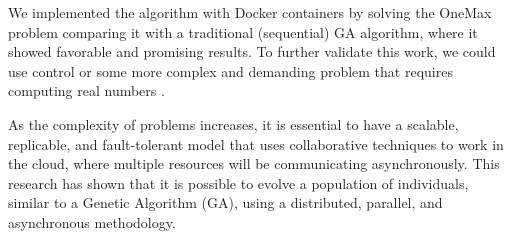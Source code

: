 \documentclass[graybox]{svmult}
\begin{document}
We implemented the algorithm with Docker containers by solving the OneMax
problem comparing it with a traditional (sequential) GA algorithm, where it
showed favorable and promising results. To further validate this work, we could
use control or some more complex and demanding problem that requires computing
real numbers \cite{stanley2002evolving,miikkulainen2019evolving}.

As the complexity of problems increases, it is essential to have a scalable,
replicable, and fault-tolerant model that uses collaborative techniques to work
in the cloud, where multiple resources will be communicating asynchronously.
This research has shown that it is possible to evolve a population of
individuals, similar to a Genetic Algorithm (GA), using a distributed,
parallel, and asynchronous methodology.
\end{document}
